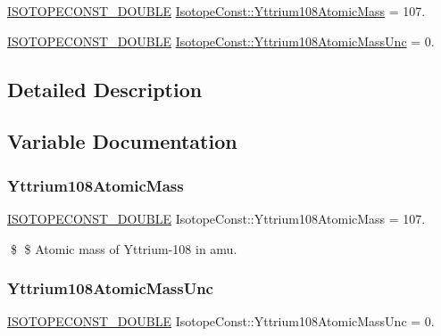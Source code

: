 \begin{DoxyCompactItemize}
\item 
\mbox{\hyperlink{group___isotope_const-_macros_ga8f45a7272ce02c0b4c65c44636ed719a}{I\+S\+O\+T\+O\+P\+E\+C\+O\+N\+S\+T\+\_\+\+D\+O\+U\+B\+LE}} \mbox{\hyperlink{group___isotope_const-_yttrium-_y108_gaf9338c111c550aee4bec01627e8f687f}{Isotope\+Const\+::\+Yttrium108\+Atomic\+Mass}} = 107.
\item 
\mbox{\hyperlink{group___isotope_const-_macros_ga8f45a7272ce02c0b4c65c44636ed719a}{I\+S\+O\+T\+O\+P\+E\+C\+O\+N\+S\+T\+\_\+\+D\+O\+U\+B\+LE}} \mbox{\hyperlink{group___isotope_const-_yttrium-_y108_ga78427022f63e3ea39c0d131de6962c3f}{Isotope\+Const\+::\+Yttrium108\+Atomic\+Mass\+Unc}} = 0.
\end{DoxyCompactItemize}


\subsection{Detailed Description}


\subsection{Variable Documentation}
\mbox{\label{group___isotope_const-_yttrium-_y108_gaf9338c111c550aee4bec01627e8f687f}} 
\subsubsection{\texorpdfstring{Yttrium108\+Atomic\+Mass}{Yttrium108AtomicMass}}
{\footnotesize\ttfamily \mbox{\hyperlink{group___isotope_const-_macros_ga8f45a7272ce02c0b4c65c44636ed719a}{I\+S\+O\+T\+O\+P\+E\+C\+O\+N\+S\+T\+\_\+\+D\+O\+U\+B\+LE}} Isotope\+Const\+::\+Yttrium108\+Atomic\+Mass = 107.}

\$ \$ Atomic mass of Yttrium-\/108 in amu. \mbox{\label{group___isotope_const-_yttrium-_y108_ga78427022f63e3ea39c0d131de6962c3f}} 
\subsubsection{\texorpdfstring{Yttrium108\+Atomic\+Mass\+Unc}{Yttrium108AtomicMassUnc}}
{\footnotesize\ttfamily \mbox{\hyperlink{group___isotope_const-_macros_ga8f45a7272ce02c0b4c65c44636ed719a}{I\+S\+O\+T\+O\+P\+E\+C\+O\+N\+S\+T\+\_\+\+D\+O\+U\+B\+LE}} Isotope\+Const\+::\+Yttrium108\+Atomic\+Mass\+Unc = 0.}

